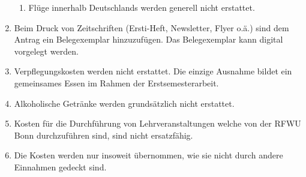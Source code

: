 \documentclass{article}
\begin{document}
\begin{enumerate}[(1)]
\begin{enumerate}[1.]
        \item Flüge innerhalb Deutschlands werden generell nicht erstattet.   
    \end{enumerate}
    \item Beim Druck von Zeitschriften (Ersti-Heft, Newsletter, Flyer o.ä.) sind dem Antrag ein Belegexemplar hinzuzufügen. 
    	Das Belegexemplar kann digital vorgelegt werden.
    \item Verpflegungskosten werden nicht erstattet. 
    	Die einzige Ausnahme bildet ein gemeinsames Essen im Rahmen der Erstsemesterarbeit. 
    \item Alkoholische Getränke werden grundsätzlich nicht erstattet.
    \item Kosten für die Durchführung von Lehrveranstaltungen welche von der RFWU Bonn durchzuführen sind, sind nicht ersatzfähig.
    \item Die Kosten  werden nur insoweit übernommen, wie sie nicht durch andere Einnahmen gedeckt sind.
\end{enumerate}
\end{document}
